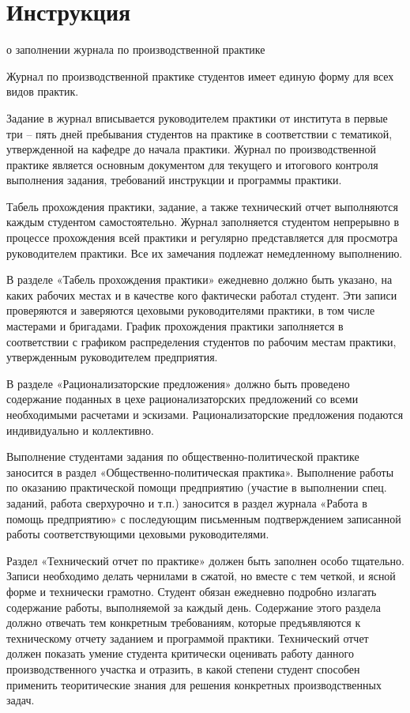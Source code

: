\newpage
\section{Инструкция}

\begin{center}
	о заполнении журнала по производственной практике
\end{center}

Журнал по производственной практике студентов имеет единую форму для всех видов практик.

Задание в журнал вписывается руководителем практики от института в первые три – пять дней пребывания студентов на практике в соответствии с тематикой, утвержденной на кафедре до начала практики. Журнал по производственной практике является основным документом для текущего и итогового контроля выполнения задания, требований инструкции и программы практики.

Табель прохождения практики, задание, а также технический отчет выполняются каждым студентом самостоятельно.
Журнал заполняется студентом непрерывно в процессе прохождения всей практики и регулярно представляется для просмотра руководителем практики. Все их замечания подлежат немедленному выполнению.

В  разделе «Табель прохождения практики» ежедневно должно быть указано, на каких рабочих местах и в качестве кого фактически работал студент. Эти записи проверяются и заверяются цеховыми руководителями практики, в том числе мастерами и бригадами. График прохождения практики заполняется в соответствии с графиком распределения студентов по рабочим местам практики, утвержденным руководителем предприятия.

В разделе «Рационализаторские предложения» должно быть проведено содержание поданных в цехе рационализаторских предложений со всеми необходимыми расчетами и эскизами. Рационализаторские предложения подаются индивидуально и коллективно.

Выполнение студентами задания по общественно-политической практике заносится в раздел «Общественно-политическая практика». Выполнение работы по оказанию практической помощи предприятию (участие в выполнении спец. заданий, работа сверхурочно и т.п.) заносится в раздел журнала «Работа в помощь предприятию» с последующим письменным подтверждением записанной работы соответствующими цеховыми руководителями.

Раздел «Технический отчет по практике» должен быть заполнен особо тщательно. Записи необходимо делать чернилами в сжатой, но вместе с тем четкой, и ясной форме и технически грамотно. Студент обязан ежедневно подробно излагать содержание работы, выполняемой за каждый день. Содержание этого раздела должно отвечать тем конкретным требованиям, которые предъявляются к техническому отчету заданием и программой практики. Технический отчет должен показать умение студента критически оценивать работу данного производственного участка и отразить, в какой степени студент способен применить теоритические знания для решения конкретных производственных задач.


